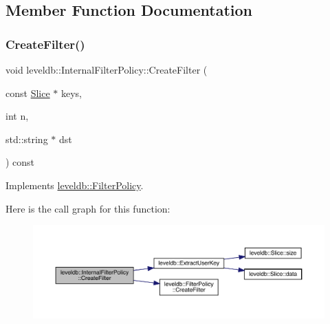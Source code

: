 \subsection{Member Function Documentation}
\mbox{\label{classleveldb_1_1_internal_filter_policy_a0ed8ebb6899c13f90853f61d0e69fbaf}} 
\subsubsection{\texorpdfstring{CreateFilter()}{CreateFilter()}}
{\footnotesize\ttfamily void leveldb\+::\+Internal\+Filter\+Policy\+::\+Create\+Filter (\begin{DoxyParamCaption}\item[{const \mbox{\hyperlink{classleveldb_1_1_slice}{Slice}} $\ast$}]{keys,  }\item[{int}]{n,  }\item[{std\+::string $\ast$}]{dst }\end{DoxyParamCaption}) const\hspace{0.3cm}{\ttfamily [virtual]}}



Implements \mbox{\hyperlink{classleveldb_1_1_filter_policy_a355e9797e16dd16b93d19056781126b2}{leveldb\+::\+Filter\+Policy}}.

Here is the call graph for this function\+:
\nopagebreak
\begin{figure}[H]
\begin{center}
\leavevmode
\includegraphics[width=350pt]{classleveldb_1_1_internal_filter_policy_a0ed8ebb6899c13f90853f61d0e69fbaf_cgraph}
\end{center}
\end{figure}
\mbox{\label{classleveldb_1_1_internal_filter_policy_aba61cb2c01f6c1d34128f115903ff559}} 
